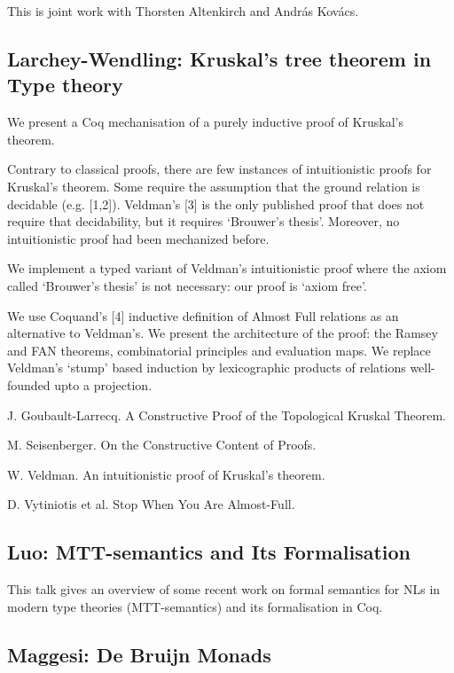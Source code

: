 \documentclass[a4paper,10pt]{scrartcl}
\begin{document}
This is joint work with Thorsten Altenkirch and András Kovács.

\subsection*{Larchey-Wendling: Kruskal's tree theorem in Type theory}

We present a Coq mechanisation of a purely inductive proof of Kruskal's theorem.

Contrary to classical proofs, there are few instances of intuitionistic proofs for Kruskal's theorem. 
Some require the assumption that the ground relation is decidable (e.g. [1,2]). 
Veldman's [3] is the only published proof that does not require that decidability, but it requires `Brouwer's thesis'. Moreover, no intuitionistic proof had been mechanized before.

We implement a typed variant of Veldman's intuitionistic proof where the axiom called `Brouwer's thesis' is not necessary: our proof is `axiom free'.

We use Coquand's [4] inductive definition of Almost Full relations as an alternative to Veldman's. We present the architecture of the proof:
the Ramsey and FAN theorems, combinatorial principles and evaluation maps. We replace Veldman's `stump' based induction by lexicographic products of relations well-founded upto a projection.

\bigskip

\noindent
[1] J. Goubault-Larrecq. A Constructive Proof of the Topological Kruskal Theorem.

\noindent
[2] M. Seisenberger. On the Constructive Content of Proofs.

\noindent
[3] W. Veldman. An intuitionistic proof of Kruskal's theorem.

\noindent
[4] D. Vytiniotis et al. Stop When You Are Almost-Full.


\subsection*{Luo: MTT-semantics and Its Formalisation}

This talk gives an overview of some recent work on formal semantics for NLs in modern type theories (MTT-semantics) and its formalisation in Coq.

\subsection*{Maggesi: De Bruijn Monads}
\end{document}
